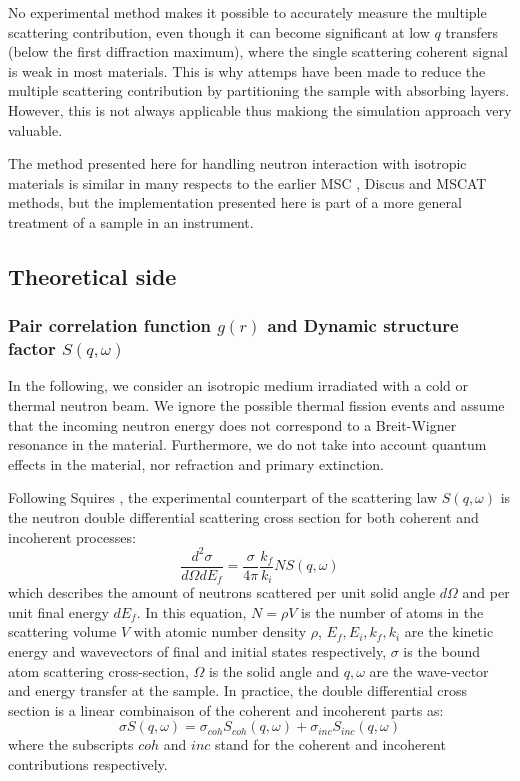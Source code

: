 No experimental method makes it possible to accurately measure the multiple scattering contribution, even though it can become significant at low $q$ transfers (below the first diffraction maximum), where the single scattering coherent signal is weak in most materials. This is why attemps have been made to reduce the multiple scattering contribution by partitioning the sample with absorbing layers. However, this is not always applicable thus makiong the simulation approach very valuable.

The method presented here for handling neutron interaction with isotropic materials is similar in many respects to the earlier MSC \cite{msc}, Discus \cite{discus} and MSCAT \cite{mscat} methods, but the implementation presented here is part of a more general treatment of a sample in an instrument.

\subsection{Theoretical side}

\subsubsection{Pair correlation function $g(r)$ and Dynamic structure factor $S(q,\omega)$}

In the following, we consider an isotropic medium irradiated with a cold or thermal neutron beam. We ignore the possible thermal fission events and assume that the incoming neutron energy does not correspond to a Breit-Wigner resonance in the material. Furthermore, we do not take into account quantum effects in the material, nor refraction and primary extinction.

Following Squires \cite{squires}, the experimental counterpart of the scattering law $S(q,\omega)$ is the neutron double differential scattering cross section for both coherent and incoherent processes:
\begin{equation}\label{eq:d2sigma}
\frac{d^2\sigma}{d\Omega dE_f} = \frac{\sigma}{4\pi}\frac{k_f}{k_i} N S(q, \omega)
\end{equation}
which describes the amount of neutrons scattered per unit solid angle $d\Omega$ and per unit final energy $dE_f$. In this equation, $N=\rho V$ is the number of atoms in the scattering volume $V$ with atomic number density $\rho$, $E_f, E_i, k_f, k_i$ are the kinetic energy and wavevectors of final and initial states respectively, $\sigma$ is the bound atom scattering cross-section, $\Omega$ is the solid angle and $q,\omega$ are the wave-vector and energy transfer at the sample. In practice, the double differential cross section is a linear combinaison of the coherent and incoherent parts as:
\begin{equation}
\label{eq:S=coh+inc}
\sigma S(q,\omega) = \sigma_{coh} S_{coh}(q,\omega) + \sigma_{inc} S_{inc}(q,\omega)
\end{equation}
where the subscripts $coh$ and $inc$ stand for the coherent and incoherent contributions respectively.

